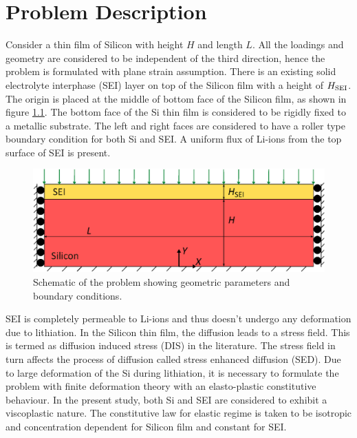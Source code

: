 \chapter{Problem Description}
Consider a thin film of Silicon with height $H$ and length $L$. All the loadings and geometry are considered to be independent of the third direction, hence the problem is formulated with plane strain assumption. There is an existing solid electrolyte interphase (SEI) layer on top of the Silicon film with a height of $H_{\rm{SEI}}$. The origin is placed at the middle of bottom face of the Silicon film, as shown in figure \ref{fig:probDesc}. The bottom face of the Si thin film is considered to be rigidly fixed to a metallic substrate. The left and right faces are considered to have a roller type boundary condition for both Si and SEI. A uniform flux of Li-ions from the top surface of SEI is present. 
\begin{figure}[H]
    \centering
    \includegraphics[width=\textwidth]{figures/drawing.eps}
    \caption{Schematic of the problem showing geometric parameters and boundary conditions.}
    \label{fig:probDesc}
\end{figure}
SEI is completely permeable to Li-ions and thus doesn't undergo any deformation due to lithiation. In the Silicon thin film, the diffusion leads to a stress field. This is termed as diffusion induced stress (DIS) in the literature. The stress field in turn affects the process of diffusion called stress enhanced diffusion (SED). 
Due to large deformation of the Si during lithiation, it is necessary to formulate the problem with finite deformation theory with an elasto-plastic constitutive behaviour. In the present study, both Si and SEI are considered to exhibit a viscoplastic nature. The constitutive law for elastic regime is taken to be isotropic and concentration dependent for Silicon film and constant for SEI. 
